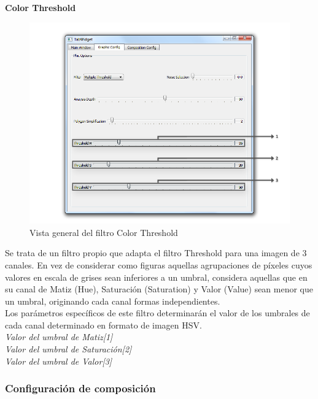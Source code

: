 	\noindent\textbf{Color Threshold}\\

		\begin{figure}[htbp]
		\centering
		\hspace*{-0.9in}
		\includegraphics[scale=0.57]{graphics/interfaz3threshold.png}
		\caption{Vista general del filtro Color Threshold}
		\label{fig:interfaz3threshold}
		\end{figure}

		Se trata de un filtro propio que adapta el filtro Threshold para una imagen de 3 canales. En vez de considerar como figuras aquellas agrupaciones de píxeles cuyos valores en escala de grises sean inferiores a un umbral, considera aquellas que en su canal de Matiz (Hue), Saturación (Saturation) y Valor (Value) sean menor que un umbral, originando cada canal formas independientes.\\
		
		Los parámetros específicos de este filtro determinarán el valor de los umbrales de cada canal determinado en formato de imagen HSV.\\		
		
		\noindent\textit{Valor del umbral de Matiz[1]}\\
		\noindent\textit{Valor del umbral de Saturación[2]}\\
		\noindent\textit{Valor del umbral de Valor[3]}




		
		\subsubsection{Configuración de composición}
		
